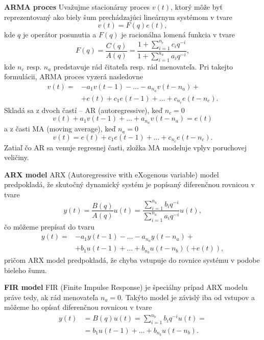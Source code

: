\textbf{ARMA proces} 
\newline
Uvažujme stacionárny proces $v(t)$, ktorý môže byť reprezentovaný ako biely šum prechádzajúci lineárnym systémom v tvare 
\begin{equation}
	v(t) = F(q)e(t),
\end{equation}
kde $q$ je operátor posunutia a $F(q)$ je racionálna lomená funkcia v tvare 
\begin{equation}
	F(q) = \frac{C(q)}{A(q)} = \frac{1 + \sum_{i=1}^{n_c} c_{i}q^{-i}}{1 + \sum_{i=1}^{n_a} a_{i}q^{-i}},
\end{equation}
kde $n_c$ resp. $n_a$ predstavuje rád čitateľa resp. rád menovateľa. Pri takejto formulácii, ARMA proces vyzerá nasledovne 
\begin{equation}
	\begin{split}
			v(t) = &-a_{1}v(t-1) - \dots -a_{n_a}v(t-n_a) + \\
				   &+e(t) + c_1e(t-1) + \dots + c_{n_c}e(t-n_c).
	\end{split} 
\end{equation}
Skladá sa z dvoch častí -- AR (autoregressive), keď $n_c = 0$
\begin{equation}
	v(t) + a_{1}v(t-1) + \dots + a_{n_a}v(t-n_a) = e(t)
\end{equation}
a z časti MA (moving average), keď $n_a = 0$
\begin{equation}
	v(t) = e(t) + c_1e(t-1) + \dots + c_{n_c}e(t-n_c).
\end{equation}
Zatiaľ čo AR sa venuje regresnej časti, zložka MA modeluje vplyv poruchovej veličiny.
 
\textbf{ARX model}
\newline
 ARX (Autoregressive with eXogenous variable) model predpokladá, že skutočný dynamický systém je popísaný diferenčnou rovnicou v tvare
 \begin{equation}
 	y(t) = \frac{B(q)}{A(q)}u(t) = \frac{\sum_{i=1}^{n_b} b_{i}q^{-i}}{\sum_{i=1}^{n_a} a_{i}q^{-i}}u(t),
 \end{equation}
 čo môžeme prepísať do tvaru 
 \begin{equation}
	 \begin{split}
		 y(t) = &- a_{1}y(t-1) - \dots - a_{n_a}y(t-n_a) + \\
		 		&+ b_{1}u(t-1) + \dots + b_{n_b}u(t-n_b) \left(+ e(t)\right), 
	 \end{split} 
 \end{equation}
 pričom ARX model predpokladá, že chyba vstupuje do rovnice systému v podobe bieleho šumu.
 
 \textbf{FIR model}
 \newline
 FIR (Finite Impulse Response) je špeciálny prípad ARX modelu práve tedy, ak rád menovateľa $n_a = 0$. Takýto model je závislý iba od vstupov a môžeme ho opísať diferenčnou rovnicou v tvare
 \begin{equation}
 	\begin{split}
 		y(t) &= B(q)u(t) = \sum_{i=1}^{n_b} b_{i}q^{-i}u(t) = \\
 			 &= b_{1}u(t-1) + \dots + b_{n_b}u(t-n_b).
 	\end{split}
 \end{equation}